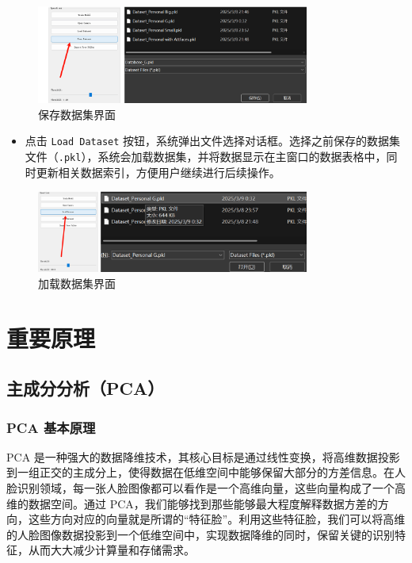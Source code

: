 \documentclass{article}
\begin{document}
\begin{figure}[H]
    \centering
    \includegraphics[width=0.8\textwidth]{Img/PixPin_2025-03-09_01-05-24.png}
    \caption{保存数据集界面}
\end{figure}

\begin{itemize}
    \item 点击 \texttt{Load Dataset} 按钮，系统弹出文件选择对话框。选择之前保存的数据集文件（\texttt{.pkl}），系统会加载数据集，并将数据显示在主窗口的数据表格中，同时更新相关数据索引，方便用户继续进行后续操作。
\end{itemize}

\begin{figure}[H]
    \centering
    \includegraphics[width=0.8\textwidth]{Img/PixPin_2025-03-09_02-37-48.png}
    \caption{加载数据集界面}
\end{figure}
\newpage
\section{重要原理}

\subsection{主成分分析（PCA）}

\subsubsection{PCA 基本原理}
PCA 是一种强大的数据降维技术，其核心目标是通过线性变换，将高维数据投影到一组正交的主成分上，使得数据在低维空间中能够保留大部分的方差信息。在人脸识别领域，每一张人脸图像都可以看作是一个高维向量，这些向量构成了一个高维的数据空间。通过 PCA，我们能够找到那些能够最大程度解释数据方差的方向，这些方向对应的向量就是所谓的“特征脸”。利用这些特征脸，我们可以将高维的人脸图像数据投影到一个低维空间中，实现数据降维的同时，保留关键的识别特征，从而大大减少计算量和存储需求。
\end{document}
